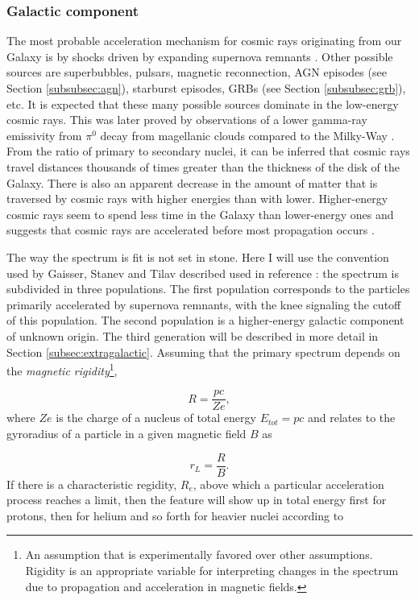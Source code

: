 \subsubsection{Galactic component}
\label{subsubsec:galactic}
The most probable acceleration mechanism for cosmic rays originating from our Galaxy is by shocks driven by expanding supernova remnants \cite{0034-4885-64-4-201}. Other possible sources are superbubbles, pulsars, magnetic reconnection, AGN episodes (see Section \ref{subsubsec:agn}), starburst episodes, GRBs (see Section \ref{subsubsec:grb}), etc. It is expected that these many possible sources dominate in the low-energy cosmic rays. This was later proved by observations of a lower gamma-ray emissivity from $\pi^0$ decay from magellanic clouds compared to the Milky-Way \cite{Fermi-LAT:2010fcp}. From the ratio of primary to secondary nuclei, it can be inferred that cosmic rays travel distances thousands of times greater than the thickness of the disk of the Galaxy. There is also an apparent decrease in the amount of matter that is traversed by cosmic rays with higher energies than with lower. Higher-energy cosmic rays seem to spend less time in the Galaxy than lower-energy ones and suggests that cosmic rays are accelerated before most propagation occurs \cite{Gaisser:2016uoy}.

The way the spectrum is fit is not set in stone. Here I will use the convention used by Gaisser, Stanev and Tilav described used in reference \cite{Gaisser:2013bla}: the spectrum is subdivided in three populations. The first population corresponds to the particles primarily accelerated by supernova remnants, with the knee signaling the cutoff of this population. The second population is a higher-energy galactic component of unknown origin. The third generation will be described in more detail in Section \ref{subsec:extragalactic}. Assuming that the primary spectrum depends on the \textit{magnetic rigidity}\footnote{An assumption that is experimentally favored over other assumptions. Rigidity is an appropriate variable for interpreting changes in the spectrum due to propagation and acceleration in magnetic fields.},

\begin{equation}
R = \frac{pc}{Ze},
\end{equation}
where $Ze$ is the charge of a nucleus of total energy $E_{tot} = pc$ and relates to the gyroradius of a particle in a given magnetic field $B$ as

\begin{equation}
\label{eq:gyro}
r_L = \frac{R}{B}.
\end{equation}
If there is a characteristic regidity, $R_e$, above which a particular acceleration process reaches a limit, then the feature will show up in total energy first for protons, then for helium and so forth for heavier nuclei according to

